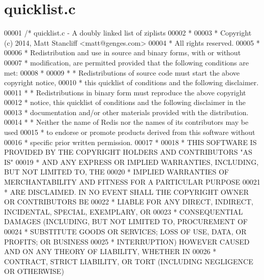 \hypertarget{quicklist_8c_source}{}\section{quicklist.\+c}
\label{quicklist_8c_source}

\begin{DoxyCode}
00001 \textcolor{comment}{/* quicklist.c - A doubly linked list of ziplists}
00002 \textcolor{comment}{ *}
00003 \textcolor{comment}{ * Copyright (c) 2014, Matt Stancliff <matt@genges.com>}
00004 \textcolor{comment}{ * All rights reserved.}
00005 \textcolor{comment}{ *}
00006 \textcolor{comment}{ * Redistribution and use in source and binary forms, with or without}
00007 \textcolor{comment}{ * modification, are permitted provided that the following conditions are met:}
00008 \textcolor{comment}{ *}
00009 \textcolor{comment}{ *   * Redistributions of source code must start the above copyright notice,}
00010 \textcolor{comment}{ *     this quicklist of conditions and the following disclaimer.}
00011 \textcolor{comment}{ *   * Redistributions in binary form must reproduce the above copyright}
00012 \textcolor{comment}{ *     notice, this quicklist of conditions and the following disclaimer in the}
00013 \textcolor{comment}{ *     documentation and/or other materials provided with the distribution.}
00014 \textcolor{comment}{ *   * Neither the name of Redis nor the names of its contributors may be used}
00015 \textcolor{comment}{ *     to endorse or promote products derived from this software without}
00016 \textcolor{comment}{ *     specific prior written permission.}
00017 \textcolor{comment}{ *}
00018 \textcolor{comment}{ * THIS SOFTWARE IS PROVIDED BY THE COPYRIGHT HOLDERS AND CONTRIBUTORS "AS IS"}
00019 \textcolor{comment}{ * AND ANY EXPRESS OR IMPLIED WARRANTIES, INCLUDING, BUT NOT LIMITED TO, THE}
00020 \textcolor{comment}{ * IMPLIED WARRANTIES OF MERCHANTABILITY AND FITNESS FOR A PARTICULAR PURPOSE}
00021 \textcolor{comment}{ * ARE DISCLAIMED. IN NO EVENT SHALL THE COPYRIGHT OWNER OR CONTRIBUTORS BE}
00022 \textcolor{comment}{ * LIABLE FOR ANY DIRECT, INDIRECT, INCIDENTAL, SPECIAL, EXEMPLARY, OR}
00023 \textcolor{comment}{ * CONSEQUENTIAL DAMAGES (INCLUDING, BUT NOT LIMITED TO, PROCUREMENT OF}
00024 \textcolor{comment}{ * SUBSTITUTE GOODS OR SERVICES; LOSS OF USE, DATA, OR PROFITS; OR BUSINESS}
00025 \textcolor{comment}{ * INTERRUPTION) HOWEVER CAUSED AND ON ANY THEORY OF LIABILITY, WHETHER IN}
00026 \textcolor{comment}{ * CONTRACT, STRICT LIABILITY, OR TORT (INCLUDING NEGLIGENCE OR OTHERWISE)}

\end{DoxyCode}
